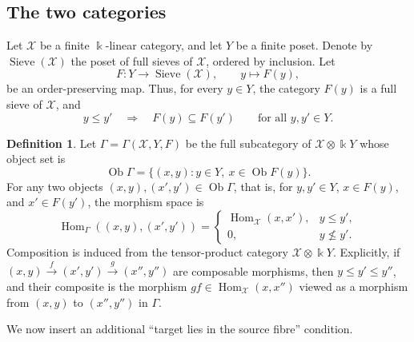 \documentclass[12pt,a4paper,english,reqno]{amsart}
\theoremstyle{plain}
\theoremstyle{definition}
\newtheorem{definition}[theorem]{Definition}
\newcommand{\kk}{\Bbbk}
\newcommand{\Hom}{\operatorname{Hom}}
\newcommand{\X}{\mathcal X}
\newcommand{\G}{\Gamma}
\begin{document}
\subsection{The two categories}

Let $\X$ be a finite $\kk$-linear category, and let $Y$ be a
finite poset. Denote by $\operatorname{Sieve}(\X)$ the poset of full
sieves of $\X$, ordered by inclusion. Let
\[
F\colon Y\longrightarrow \operatorname{Sieve}(\X),
\qquad
y\longmapsto F(y),
\]
be an order-preserving map. Thus, for every $y\in Y$, the category
$F(y)$ is a full sieve of $\X$, and
\begin{equation}
y\leq y'
\quad\Longrightarrow\quad
F(y)\subseteq F(y')
\qquad
\text{for all }y,y'\in Y.
\label{eq:F-monotone}
\end{equation}

\begin{definition}
\label{def:Gamma}
Let $\G=\G(\X,Y,F)$ be the full subcategory of
$\X\otimes\kk Y$ whose object set is
\[
\operatorname{Ob}\G
=
\{(x,y):y\in Y,\ x\in\operatorname{Ob}F(y)\}.
\]
For any two objects $(x,y),(x',y')\in\operatorname{Ob}\G$,
that is, for $y,y'\in Y$, $x\in F(y)$, and $x'\in F(y')$, the
morphism space is
\[
\Hom_{\G}((x,y),(x',y'))
=
\begin{cases}
\Hom_{\X}(x,x'), & y\leq y',\\
0,                & y\nleq y'.
\end{cases}
\]
Composition is induced from the tensor-product category
$\X\otimes\kk Y$. Explicitly, if $(x,y)\xrightarrow{f}(x',y')
\xrightarrow{g}(x'',y'')$
are composable morphisms, then $y\leq y'\leq y''$, and their composite
is the morphism $gf\in\Hom_{\X}(x,x'')$
viewed as a morphism from $(x,y)$ to $(x'',y'')$ in $\G$.
\end{definition}
We now insert an additional ``target lies in the source fibre'' condition.
\end{document}
